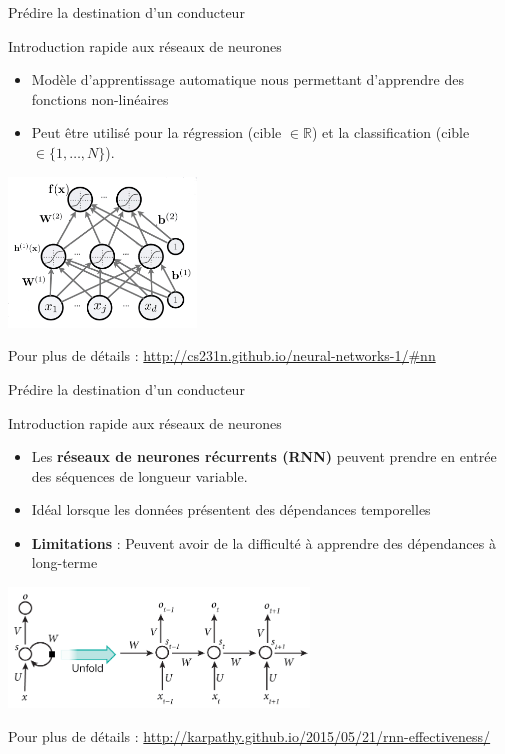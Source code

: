 \documentclass[aspectratio=169]{beamer}
\begin{document}
\begin{frame}{Prédire la destination d'un conducteur}

{\Large Introduction rapide aux réseaux de neurones}

\begin{itemize}
	\item Modèle d'apprentissage automatique nous permettant d'apprendre des fonctions non-linéaires
	\item Peut être utilisé pour la régression (cible $\in \mathbb{R}$) et la classification (cible$\in \{1, \dots, N\}$).
\end{itemize}
\centering
\includegraphics[height=4cm]{figures/nn}

Pour plus de détails : \url{http://cs231n.github.io/neural-networks-1/#nn}

\end{frame}

\begin{frame}{Prédire la destination d'un conducteur}

{\Large Introduction rapide aux réseaux de neurones}

\begin{itemize}
	\item Les \textbf{réseaux de neurones récurrents (RNN)} peuvent prendre en entrée des séquences de longueur variable.
	\item Idéal lorsque les données présentent des dépendances temporelles
	\item \textbf{Limitations} : Peuvent avoir de la difficulté à apprendre des dépendances à long-terme
\end{itemize}
\centering
\includegraphics[width=0.6\textwidth]{figures/rnn}

Pour plus de détails : \url{http://karpathy.github.io/2015/05/21/rnn-effectiveness/}

\end{frame}
\end{document}
